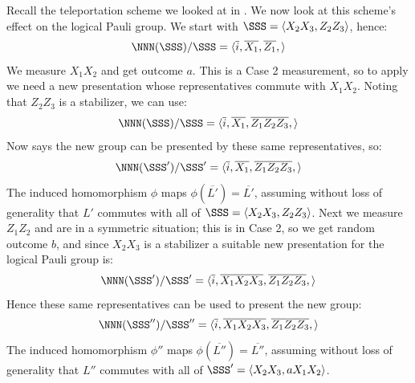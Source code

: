 \begin{example}\label{ex:teleportation_logical_pauli_group_updates}
    Recall the teleportation scheme we looked at in .
    We now look at this scheme's effect on the logical Pauli group.
    We start with $\SSS = \langle X_2 X_3, Z_2 Z_3 \rangle$, hence:
    \begin{equation}
        \NNN(\SSS)/\SSS = \langle
            \overline{i},
            \overline{X_1}, \overline{Z_1},
        \rangle
    \end{equation}
    We measure $X_1 X_2$ and get outcome $a$.
    This is a Case 2 measurement, so to apply  we need a new presentation whose representatives commute with $X_1 X_2$.
    Noting that $Z_2 Z_3$ is a stabilizer, we can use:
    \begin{equation}
        \NNN(\SSS)/\SSS = \langle
            \overline{i},
            \overline{X_1}, \overline{Z_1 Z_2 Z_3},
        \rangle
    \end{equation}
    Now  says the new group can be presented by these same representatives, so:
    \begin{equation}
        \NNN(\SSS')/\SSS' = \langle
        \overline{i},
        \overline{X_1}, \overline{Z_1 Z_2 Z_3},
        \rangle
    \end{equation}
    The induced homomorphism $\phi$ maps $\phi(\overline{L'}) = \overline{L'}$, assuming without loss of generality that $L'$ commutes with all of $\SSS = \langle X_2 X_3, Z_2 Z_3 \rangle$.
    Next we measure $Z_1 Z_2$ and are in a symmetric situation; this is in Case 2, so we get random outcome $b$, and since $X_2 X_3$ is a stabilizer a suitable new presentation for the logical Pauli group is:
    \begin{equation}
        \NNN(\SSS')/\SSS' = \langle
        \overline{i},
        \overline{X_1 X_2 X_3}, \overline{Z_1 Z_2 Z_3},
        \rangle
    \end{equation}
    Hence these same representatives can be used to present the new group:
    \begin{equation}
        \NNN(\SSS'')/\SSS'' = \langle
        \overline{i},
        \overline{X_1 X_2 X_3}, \overline{Z_1 Z_2 Z_3},
        \rangle
    \end{equation}
    The induced homomorphism $\phi''$ maps $\phi(\overline{L''}) = \overline{L''}$, assuming without loss of generality that $L''$ commutes with all of $\SSS' = \langle X_2 X_3, a X_1 X_2 \rangle$.

\end{example}
